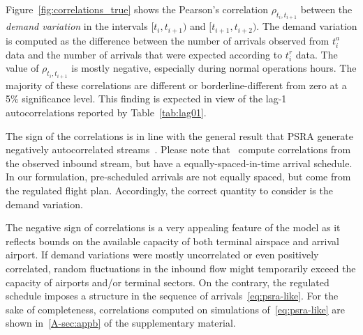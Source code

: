 \documentclass[final,review]{elsarticle}
\begin{document}
Figure~\ref{fig:correlations_true} shows the Pearson's correlation \(\rho_{t_i, t_{i+1}}\) between the \emph{demand variation} in the intervals \([t_i, t_{i+1})\) and \([t_{i+1}, t_{i+2})\).
The demand variation is computed as the difference between the number of arrivals observed from \(t^{a}_i\) data and the number of arrivals that were expected according to \(t^{r}_i\) data.
The value of \(\rho_{t_i, t_{i+1}}\) is mostly negative, especially during normal operations hours.
The majority of these correlations are different or borderline-different from zero at a 5\% significance level.
This finding is expected in view of the lag-1 autocorrelations reported by Table~\ref{tab:lag01}.
\begin{kpt}
	The sign of the correlations is in line with the general result that \ac{PSRA} generate negatively autocorrelated streams~\citep{guadagni2011queueing}.
  Please note that~\citet{guadagni2011queueing} compute correlations from the observed inbound stream, but have a equally-spaced-in-time arrival schedule.  In our formulation, pre-scheduled arrivals are not equally spaced, but come from the regulated flight plan.
  Accordingly, the correct quantity to consider is the demand variation.
\end{kpt}


  The negative sign of correlations is a very appealing feature of the model as it reflects bounds on the available capacity of both terminal airspace and arrival airport.
  If demand variations were mostly uncorrelated or even positively correlated, random fluctuations in the inbound flow might temporarily exceed the capacity of airports and/or terminal sectors.
  On the contrary, the regulated schedule imposes a structure in the sequence of arrivals~\eqref{eq:psra-like}.
For the sake of completeness, correlations computed on simulations of~\ref{eq:psra-like} are shown in~\ref{A-sec:appb} of the supplementary material.
\end{document}
